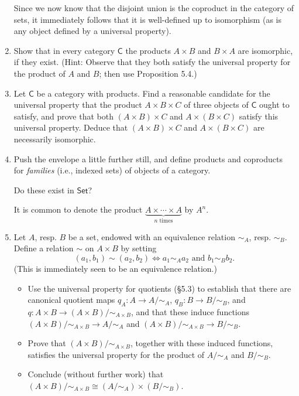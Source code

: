 \begin{enumerate}
\begin{solution}
                  Since we now know that the disjoint union is the coproduct in the category of sets, it immediately follows that it is well-defined up to isomorphism (as is any object defined by a universal property).
            \end{solution}
      \item Show that in every category $\mathsf{C}$ the products $A \times B$ and $B \times A$ are isomorphic, if they exist. (Hint: Observe that they both satisfy the universal property for the product of $A$ and $B$; then use Proposition 5.4.)
      \item Let $\mathsf{C}$ be a category with products. Find a reasonable candidate for the universal property that the product $A \times B \times C$ of three objects of $\mathsf{C}$ ought to satisfy, and prove that both $(A \times B) \times C$ and $A \times (B \times C)$ satisfy this universal property. Deduce that $(A \times B) \times C$ and $A \times (B \times C)$ are necessarily isomorphic.
      \item Push the envelope a little further still, and define products and coproducts for \textit{families} (i.e., indexed sets) of objects of a category.

            Do these exist in $\mathsf{Set}$?

            It is common to denote the product $\underbrace{A \times \cdots \times A}_{n \text{ times}}$ by $A^n$.

      \item Let $A$, resp. $B$ be a set, endowed with an equivalence relation $\sim_A$, resp. $\sim_B$. Define a relation $\sim$ on $A \times B$ by setting
            \[ (a_1, b_1) \sim (a_2, b_2) \iff a_1 \sim_A a_2 \text{ and } b_1 \sim_B b_2. \]
            (This is immediately seen to be an equivalence relation.)
            \begin{itemize}
                  \item Use the universal property for quotients (\S5.3) to establish that there are canonical quotient maps $q_A : A \to A/{\sim_A}$, $q_B : B \to B/{\sim_B}$, and $q : A \times B \to (A \times B)/{\sim_{A \times B}}$, and that these induce functions $(A \times B)/{\sim_{A \times B}} \to A/{\sim_A}$ and $(A \times B)/{\sim_{A \times B}} \to B/{\sim_B}$.
                  \item Prove that $(A \times B)/{\sim_{A \times B}}$, together with these induced functions, satisfies the universal property for the product of $A/{\sim_A}$ and $B/{\sim_B}$.
                  \item Conclude (without further work) that $(A \times B)/{\sim_{A \times B}} \cong (A/{\sim_A}) \times (B/{\sim_B})$.
            \end{itemize}


\end{enumerate}
